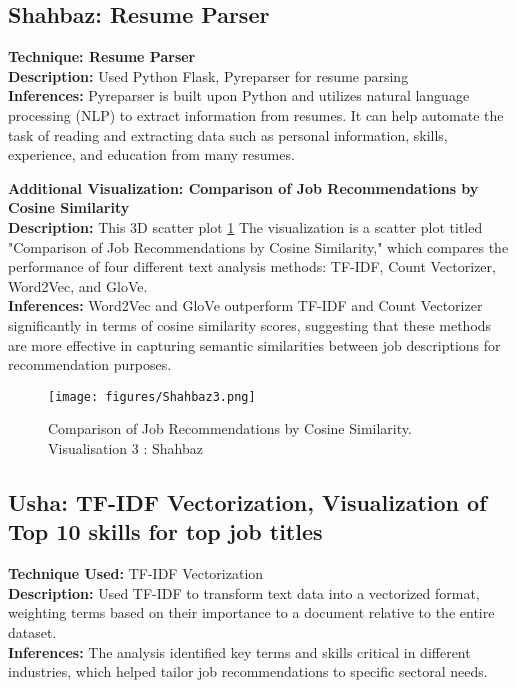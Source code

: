 \documentclass[a4paper,10pt]{article}
\begin{document}
\subsection{Shahbaz: Resume Parser}
\textbf{Technique: Resume Parser}\\
\textbf{Description:} Used Python Flask, Pyreparser for resume parsing \\
\textbf{Inferences:} Pyreparser is built upon Python and utilizes natural language processing (NLP) to extract information from resumes. It can help automate the task of reading and extracting data such as personal information, skills, experience, and education from many resumes.

\textbf{Additional Visualization: Comparison of Job Recommendations by Cosine Similarity}\\
\textbf{Description:} This 3D scatter plot \ref{fig_shahbaz3} The visualization is a scatter plot titled "Comparison of Job Recommendations by Cosine Similarity," which compares the performance of four different text analysis methods: TF-IDF, Count Vectorizer, Word2Vec, and GloVe.  \\
\textbf{Inferences:} Word2Vec and GloVe outperform TF-IDF and Count Vectorizer significantly in terms of cosine similarity scores, suggesting that these methods are more effective in capturing semantic similarities between job descriptions for recommendation purposes.

    \begin{figure}[ht]
    \centering
    \texttt{[image: figures/Shahbaz3.png]}
    \caption{Comparison of Job Recommendations by Cosine Similarity. Visualisation 3 : Shahbaz}
    \label{fig_shahbaz3}
    \end{figure}




\subsection{Usha: TF-IDF Vectorization, Visualization of Top 10 skills for top job titles}
\textbf{Technique Used:} TF-IDF Vectorization\\
\textbf{Description:} Used TF-IDF to transform text data into a vectorized format, weighting terms based on their importance to a document relative to the entire dataset.\\
\textbf{Inferences:} The analysis identified key terms and skills critical in different industries, which helped tailor job recommendations to specific sectoral needs.
\end{document}
